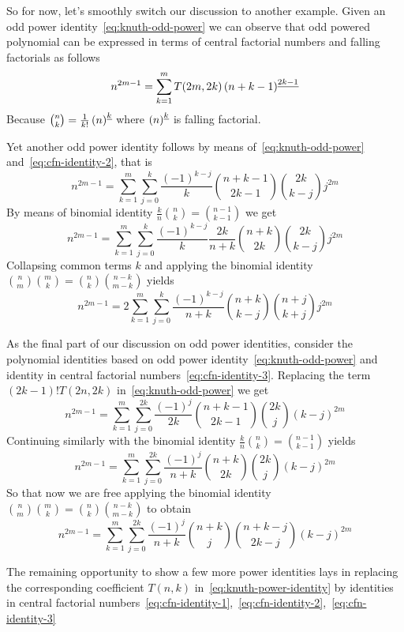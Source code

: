 So for now, let's smoothly switch our discussion to another example.
Given an odd power identity~\eqref{eq:knuth-odd-power} we can observe that odd powered polynomial can be expressed in terms of
central factorial numbers and falling factorials as follows
\begin{equation*}
    n^{2m-1} = \sum_{k=1}^{m} T(2m,2k) \left(n+k-1 \right)^{\underline{2k-1}}
\end{equation*}
Because $\binom{n}{k} = \frac{1}{k!} \left(n \right)^{\underline{k}}$ where $\left(n \right)^{\underline{k}}$ is falling factorial.

Yet another odd power identity follows by means of~\eqref{eq:knuth-odd-power} and~\eqref{eq:cfn-identity-2}, that is
\begin{equation*}
    n^{2m-1} = \sum_{k=1}^{m} \sum_{j=0}^{k} \frac{(-1)^{k-j}}{k} \binom{n+k-1}{2k-1} \binom{2k}{k-j} j^{2m}
\end{equation*}
By means of binomial identity $\frac{k}{n} \binom{n}{k} = \binom{n-1}{k-1}$ we get
\begin{equation*}
    n^{2m-1} = \sum_{k=1}^{m} \sum_{j=0}^{k} \frac{(-1)^{k-j}}{k} \frac{2k}{n+k} \binom{n+k}{2k} \binom{2k}{k-j} j^{2m}
\end{equation*}
Collapsing common terms $k$ and applying the binomial identity
$\binom{n}{m} \binom{m}{k} = \binom{n}{k} \binom{n-k}{m-k}$ yields
\begin{equation*}
    n^{2m-1} = 2\sum_{k=1}^{m} \sum_{j=0}^{k} \frac{(-1)^{k-j}}{n+k} \binom{n+k}{k-j} \binom{n+j}{k+j} j^{2m}
\end{equation*}

As the final part of our discussion on odd power identities,
consider the polynomial identities based on odd power identity~\eqref{eq:knuth-odd-power}
and identity in central factorial numbers~\eqref{eq:cfn-identity-3}.
Replacing the term $(2k-1)!T(2n, 2k)$ in~\eqref{eq:knuth-odd-power} we get
\begin{equation*}
    n^{2m-1} = \sum_{k=1}^{m} \sum_{j=0}^{2k} \frac{(-1)^{j}}{2k} \binom{n+k-1}{2k-1} \binom{2k}{j} (k-j)^{2m}
\end{equation*}
Continuing similarly with the binomial identity $\frac{k}{n} \binom{n}{k} = \binom{n-1}{k-1}$ yields
\begin{equation*}
    n^{2m-1} = \sum_{k=1}^{m} \sum_{j=0}^{2k} \frac{(-1)^{j}}{n+k} \binom{n+k}{2k} \binom{2k}{j} (k-j)^{2m}
\end{equation*}
So that now we are free applying the binomial identity $\binom{n}{m} \binom{m}{k} = \binom{n}{k} \binom{n-k}{m-k}$
to obtain
\begin{equation*}
    n^{2m-1} = \sum_{k=1}^{m} \sum_{j=0}^{2k} \frac{(-1)^{j}}{n+k} \binom{n+k}{j} \binom{n+k-j}{2k-j} (k-j)^{2m}
\end{equation*}

The remaining opportunity to show a few more power identities lays in replacing the corresponding coefficient $T(n,k)$
in~\eqref{eq:knuth-power-identity} by identities
in central factorial numbers~\eqref{eq:cfn-identity-1},~\eqref{eq:cfn-identity-2},~\eqref{eq:cfn-identity-3}
